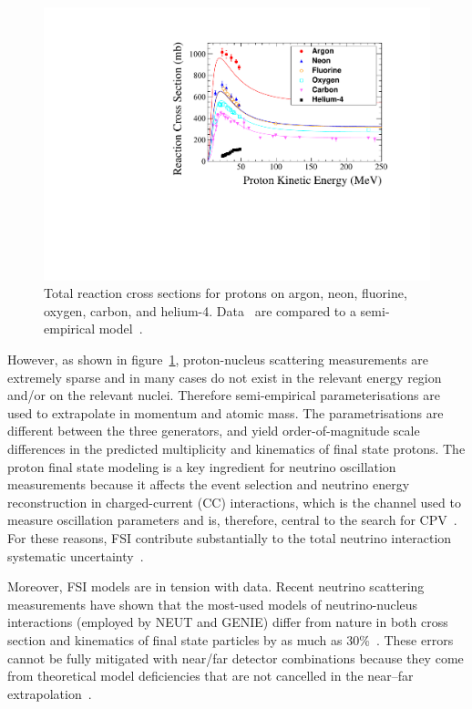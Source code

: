 \begin{figure}%
    \centering
    \includegraphics[width=12cm]{files/Figures/DataProtonCrossSections.pdf}%
    \caption{Total reaction cross sections for protons on argon, neon, fluorine, oxygen, carbon, and helium-4. Data~\cite{Carlson:1996ofz} are compared to a semi-empirical model~\cite{wellisch1996total}.}
    \label{fig:DataProtonXSec}%
\end{figure}

However, as shown in figure~\ref{fig:DataProtonXSec}, proton-nucleus scattering measurements are extremely sparse and in many cases do not exist in the relevant energy region and/or on the relevant nuclei.
Therefore semi-empirical parameterisations are used to extrapolate in momentum and atomic mass.  
The parametrisations are different between the three generators, and yield order-of-magnitude scale differences in the predicted multiplicity and kinematics of final state protons.
The proton final state modeling is a key ingredient for neutrino oscillation measurements because it affects the event selection and neutrino energy reconstruction in charged-current (CC) interactions, which is the channel used to measure oscillation parameters and is, therefore, central to the search for CPV~\cite{Abe:2013hdq}.
For these reasons, FSI contribute substantially to the total neutrino interaction systematic uncertainty~\cite{Abe:2019vii}. 

Moreover, FSI models are in tension with data.  
Recent neutrino scattering measurements have shown that the most-used models of neutrino-nucleus interactions (employed by NEUT and GENIE) differ from nature in both cross section and kinematics of final state particles by as much as 30\%~\cite{McFarland:2018aaa}. 
These errors cannot be fully mitigated with near/far detector combinations because they come from theoretical model deficiencies that are not cancelled in the near–far extrapolation~\cite{Coloma:2013rqa}. 

